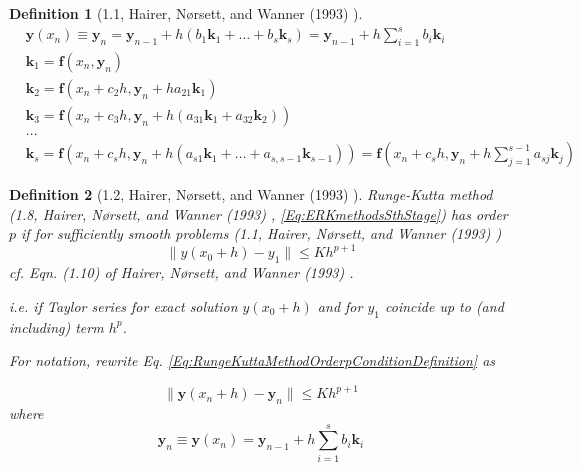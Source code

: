 \documentclass[10pt]{amsart}
\newtheorem{definition}{Definition}
\begin{document}
\begin{multicols*}{2}
\begin{definition}[1.1, Hairer, N\o rsett, and Wanner (1993) \cite{HNW1993}]
\begin{equation}\label{Eq:ERKmethodsSthStageMyNotation}
	\begin{aligned}
		& \mathbf{y}(x_n) \equiv \mathbf{y}_n = \mathbf{y}_{n-1} + h(b_1\mathbf{k}_1 + \dots + b_s \mathbf{k}_s) = \mathbf{y}_{n-1} + h \sum_{i=1}^s b_i \mathbf{k}_i \\
		& \mathbf{k}_1 = \mathbf{f}(x_n, \mathbf{y}_n) \\
		& \mathbf{k}_2 = \mathbf{f}(x_n + c_2h, \mathbf{y}_n + ha_{21} \mathbf{k}_1) \\
		& \mathbf{k}_3 = \mathbf{f}(x_n + c_3h, \mathbf{y}_n + h(a_{31} \mathbf{k}_1 + a_{32}\mathbf{k}_2)) \\
		& \dots \\
		& \mathbf{k}_s = \mathbf{f}(x_n + c_s h, \mathbf{y}_n + h(a_{s1} \mathbf{k}_1+ \dots + a_{s, s-1} \mathbf{k}_{s-1})) = \mathbf{f}(x_n + c_s h, \mathbf{y}_n + h \sum_{j=1}^{s-1} a_{sj} \mathbf{k}_j)
	\end{aligned}
\end{equation}

\end{definition}

\begin{definition}[1.2, Hairer, N\o rsett, and Wanner (1993) \cite{HNW1993}]
	Runge-Kutta method (1.8, Hairer, N\o rsett, and Wanner (1993) \cite{HNW1993}, \ref{Eq:ERKmethodsSthStage}) has order $p$ if for sufficiently smooth problems (1.1, Hairer, N\o rsett, and Wanner (1993) \cite{HNW1993})
\begin{equation}\label{Eq:RungeKuttaMethodOrderpConditionDefinition}
	\| y(x_0 + h) - y_1 \| \leq K h^{p + 1}
\end{equation}
cf. Eqn. (1.10) of Hairer, N\o rsett, and Wanner (1993) \cite{HNW1993}.

i.e. if Taylor series for exact solution $y(x_0 + h)$ and for $y_1$ coincide up to (and including) term $h^p$.

For notation, rewrite Eq. \ref{Eq:RungeKuttaMethodOrderpConditionDefinition} as

\begin{equation}
	\| \mathbf{y}(x_n + h) - \mathbf{y}_n \| \leq Kh^{p+1}
\end{equation}
where
\begin{equation}
\mathbf{y}_n \equiv \mathbf{y}(x_n) = \mathbf{y}_{n-1} + h \sum_{i=1}^{s} b_i \mathbf{k}_i
\end{equation}

\end{definition}





\end{multicols*}
\end{document}
